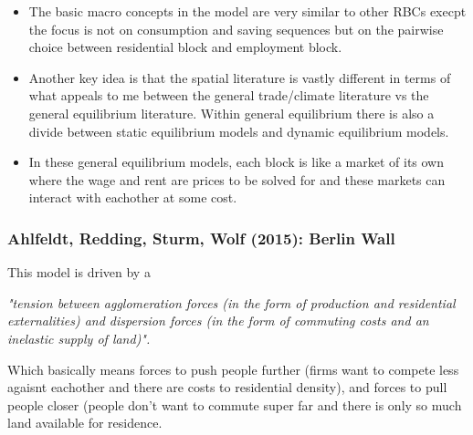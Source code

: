 \documentclass[11pt,english]{article}
\begin{document}
\begin{itemize}
\item The basic macro concepts in the model are very similar to other RBCs execpt the focus is not on consumption and saving sequences but on the pairwise choice between residential block and employment block.

\item  Another key idea is that the spatial literature is vastly different in terms of what appeals to me between the general trade/climate literature vs the general equilibrium literature. Within general equilibrium there is also a divide between static equilibrium models and dynamic equilibrium models.

\item In these general equilibrium models, each block is like a market of its own where the wage and rent are prices to be solved for and these markets can interact with eachother at some cost.
\end{itemize}

\subsubsection{Ahlfeldt, Redding, Sturm, Wolf (2015): Berlin Wall\cite{Ahlfeldt2015}}

This model is driven by a \begin{center}\textit{"tension between agglomeration forces (in the form of production and residential externalities) and dispersion forces (in the form of commuting costs and an inelastic supply of land)".}\end{center} Which basically means forces to push people further (firms want to compete less agaisnt eachother and there are costs to residential density), and forces to pull people closer (people don't want to commute super far and there is only so much land available for residence.\\
\end{document}
